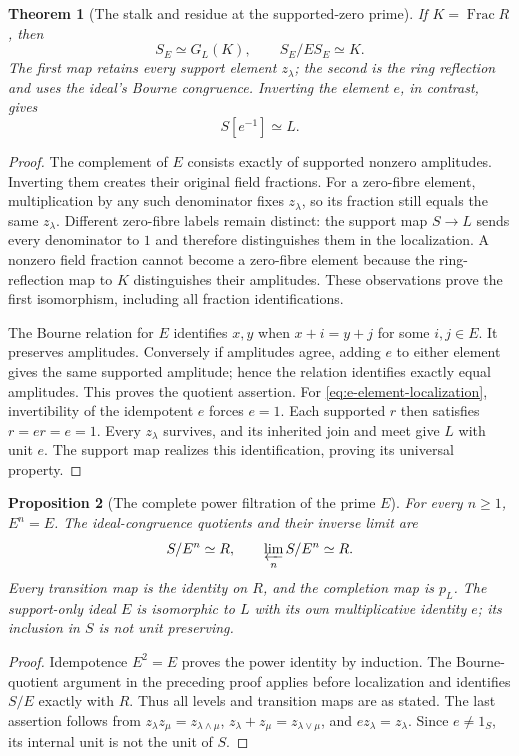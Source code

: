 \documentclass[11pt,a4paper]{article}
\newtheorem{theorem}{Theorem}[section]
\newtheorem{proposition}[theorem]{Proposition}
\theoremstyle{definition}\newtheorem{definition}[theorem]{Definition}
\begin{document}
\begin{theorem}[The stalk and residue at the supported-zero prime]\label{thm:e-stalk}
If $K=\operatorname{Frac}R$, then
\begin{equation}\label{eq:e-localization}
 S_E\simeq G_L(K),\qquad S_E/E S_E\simeq K.
\end{equation}
The first map retains every support element $z_\lambda$; the second is the ring reflection and uses the ideal's Bourne congruence. Inverting the element $e$, in contrast, gives
\begin{equation}\label{eq:e-element-localization}
 S[e^{-1}]\simeq L.
\end{equation}
\end{theorem}
\begin{proof}
The complement of $E$ consists exactly of supported nonzero amplitudes. Inverting them creates their original field fractions. For a zero-fibre element, multiplication by any such denominator fixes $z_\lambda$, so its fraction still equals the same $z_\lambda$. Different zero-fibre labels remain distinct: the support map $S\to L$ sends every denominator to $1$ and therefore distinguishes them in the localization. A nonzero field fraction cannot become a zero-fibre element because the ring-reflection map to $K$ distinguishes their amplitudes. These observations prove the first isomorphism, including all fraction identifications.

The Bourne relation for $E$ identifies $x,y$ when $x+i=y+j$ for some $i,j\in E$. It preserves amplitudes. Conversely if amplitudes agree, adding $e$ to either element gives the same supported amplitude; hence the relation identifies exactly equal amplitudes. This proves the quotient assertion. For \eqref{eq:e-element-localization}, invertibility of the idempotent $e$ forces $e=1$. Each supported $r$ then satisfies $r=er=e=1$. Every $z_\lambda$ survives, and its inherited join and meet give $L$ with unit $e$. The support map realizes this identification, proving its universal property.
\end{proof}

\begin{proposition}[The complete power filtration of the prime $E$]\label{prop:e-adic}
For every $n\ge1$, $E^n=E$. The ideal-congruence quotients and their inverse limit are
\begin{equation}\label{eq:e-completion}
 S/E^n\simeq R,\qquad \varprojlim_n S/E^n\simeq R.
\end{equation}
Every transition map is the identity on $R$, and the completion map is $p_L$. The support-only ideal $E$ is isomorphic to $L$ with its own multiplicative identity $e$; its inclusion in $S$ is not unit preserving.
\end{proposition}
\begin{proof}
Idempotence $E^2=E$ proves the power identity by induction. The Bourne-quotient argument in the preceding proof applies before localization and identifies $S/E$ exactly with $R$. Thus all levels and transition maps are as stated. The last assertion follows from $z_\lambda z_\mu=z_{\lambda\wedge\mu}$, $z_\lambda+z_\mu=z_{\lambda\vee\mu}$, and $ez_\lambda=z_\lambda$. Since $e\ne1_S$, its internal unit is not the unit of $S$.
\end{proof}
\end{document}
